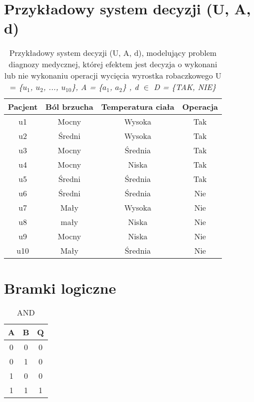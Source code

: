 \documentclass[12pt, letterpaper, titlepage]{article}
\begin{document}
\section{Przykładowy system decyzji (U, A, d)}

\begin{table}[h]
\centering\caption{Przykładowy system decyzji (U, A, d), modelujący problem diagnozy medycznej, której efektem jest decyzja o wykonani lub nie wykonaniu operacji wycięcia wyrostka robaczkowego U = \textit{{\{$u_1$, $u_2$, ..., $u_{10}$}\}, A = {\{$a_1$, $a_2$}\} ,  d $\in$ D = {\{TAK, NIE}\}}\newline}
\begin{tabular}{c| c c c}
\hline
\hline
Pacjent & Ból brzucha & Temperatura ciała & Operacja\\
\hline
u1 & Mocny & Wysoka & Tak\\

u2 & Średni & Wysoka & Tak\\

u3 & Mocny & Średnia & Tak\\

u4 & Mocny & Niska & Tak\\

u5 & Średni & Średnia & Tak\\

u6 & Średni & Średnia & Nie\\

u7 & Mały & Wysoka & Nie\\

u8 & mały & Niska & Nie\\

u9 & Mocny & Niska & Nie\\

u10 & Mały & Średnia & Nie\\

\hline
\hline
\end{tabular}
\end{table}

\section{Bramki logiczne}

\begin{table}[h]
\centering\caption{AND}
\begin{tabular}{c c| c}

A & B & Q\\
\hline
0 & 0 & 0\\
0 & 1 & 0\\
1 & 0 & 0\\
1 & 1 & 1\\

\end{tabular}
\end{table}
\end{document}

